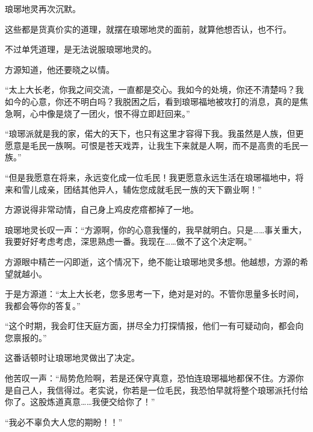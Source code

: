 \begin{this_body}
琅琊地灵再次沉默。

这些都是货真价实的道理，就摆在琅琊地灵的面前，就算他想否认，也不行。

不过单凭道理，是无法说服琅琊地灵的。

方源知道，他还要晓之以情。

“太上大长老，你我之间交流，一直都是交心。我如今的处境，你还不清楚吗？我如今的心意，你还不明白吗？我脱困之后，看到琅琊福地被攻打的消息，真的是焦急啊，心中像是烧了一团火，恨不得立即赶回来。”

“琅琊派就是我的家，偌大的天下，也只有这里才容得下我。我虽然是人族，但更愿意是毛民一族啊。可恨是苍天戏弄，让我生下来就是人啊，而不是高贵的毛民一族。”

“但是我愿意在将来，永远变化成一位毛民！我更愿意永远生活在琅琊福地中，将来和雪儿成亲，团结其他异人，辅佐您成就毛民一族的天下霸业啊！”

方源说得非常动情，自己身上鸡皮疙瘩都掉了一地。

琅琊地灵长叹一声：“方源啊，你的心意我懂的，我早就明白。只是……事关重大，我要好好考虑考虑，深思熟虑一番。我现在……做不了这个决定啊。”

方源眼中精芒一闪即逝，这个情况下，绝不能让琅琊地灵多想。他越想，方源的希望就越小。

于是方源道：“太上大长老，您多思考一下，绝对是对的。不管你思量多长时间，我都会等你的答复。”

“这个时期，我会盯住天庭方面，拼尽全力打探情报，他们一有可疑动向，都会向您禀报的。”

这番话顿时让琅琊地灵做出了决定。

他苦叹一声：“局势危险啊，若是还保守真意，恐怕连琅琊福地都保不住。方源你是自己人，我信得过。老实说，你若是一位毛民，我恐怕早就将整个琅琊派托付给你了。这股炼道真意……我便交给你了！”

“我必不辜负大人您的期盼！！”

\end{this_body}


